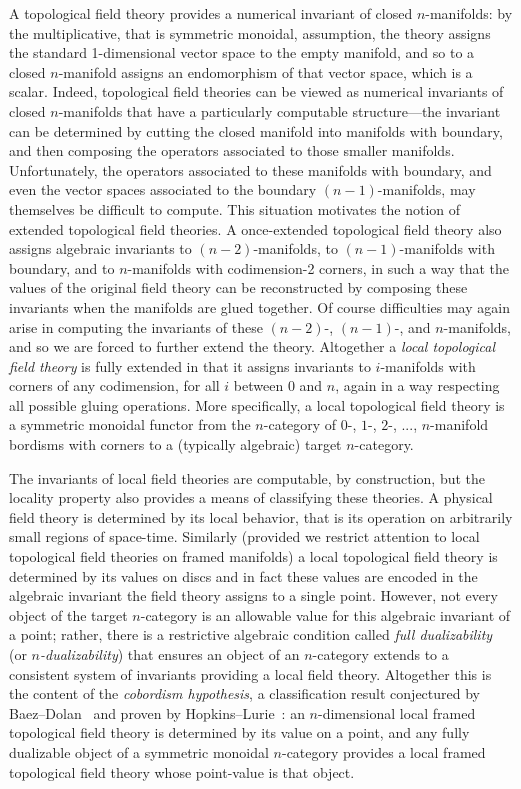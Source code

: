 \documentclass{amsart}
\begin{document}
A topological field theory provides a numerical invariant of closed $n$-manifolds: by the multiplicative, that is symmetric monoidal, assumption, the theory assigns the standard 1-dimensional vector space to the empty manifold, and so to a closed $n$-manifold assigns an endomorphism of that vector space, which is a scalar.  Indeed, topological field theories can be viewed as numerical invariants of closed $n$-manifolds that have a particularly computable structure---the invariant can be determined by cutting the closed manifold into manifolds with boundary, and then composing the operators associated to those smaller manifolds.  Unfortunately, the operators associated to these manifolds with boundary, and even the vector spaces associated to the boundary $(n-1)$-manifolds, may themselves be difficult to compute.  This situation motivates the notion of extended topological field theories.  A once-extended topological field theory also assigns algebraic invariants to $(n-2)$-manifolds, to $(n-1)$-manifolds with boundary, and to $n$-manifolds with codimension-2 corners, in such a way that the values of the original field theory can be reconstructed by composing these invariants when the manifolds are glued together.  Of course difficulties may again arise in computing the invariants of these $(n-2)$-, $(n-1)$-, and $n$-manifolds, and so we are forced to further extend the theory.  Altogether a \emph{local topological field theory} is fully extended in that it assigns invariants to $i$-manifolds with corners of any codimension, for all $i$ between $0$ and $n$, again in a way respecting all possible gluing operations.  More specifically, a local topological field theory is a symmetric monoidal functor from the $n$-category of $0$-, $1$-, $2$-, ..., $n$-manifold bordisms with corners to a (typically algebraic) target $n$-category.

The invariants of local field theories are computable, by construction, but the locality property also provides a means of classifying these theories.  A physical field theory is determined by its local behavior, that is its operation on arbitrarily small regions of space-time.  Similarly (provided we restrict attention to local topological field theories on framed manifolds) a local topological field theory is determined by its values on discs and in fact these values are encoded in the algebraic invariant the field theory assigns to a single point.  However, not every object of the target $n$-category is an allowable value for this algebraic invariant of a point; rather, there is a restrictive algebraic condition called \emph{full dualizability} (or \emph{$n$-dualizability}) that ensures an object of an $n$-category extends to a consistent system of invariants providing a local field theory.  Altogether this is the content of the \emph{cobordism hypothesis}, a classification result conjectured by Baez--Dolan~\cite{MR1355899} and proven by Hopkins--Lurie~\cite{lurie-ch}: an $n$-dimensional local framed topological field theory is determined by its value on a point, and any fully dualizable object of a symmetric monoidal $n$-category provides a local framed topological field theory whose point-value is that object.
\end{document}
